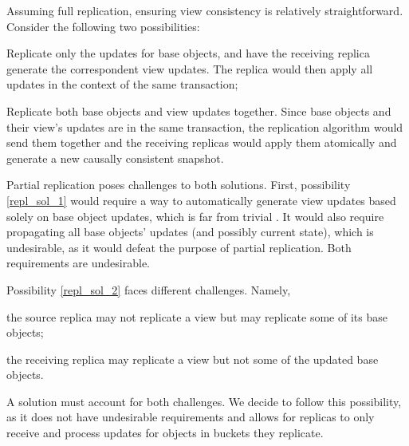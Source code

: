 \documentclass{vldb}
\begin{document}
Assuming full replication, ensuring view consistency is relatively straightforward.
Consider the following two possibilities:

\begin{compactenum}
	\item \label{repl_sol_1} Replicate only the updates for base objects, and have the receiving replica generate the correspondent view updates. The replica would then apply all updates in the context of the same transaction;
	\item \label{repl_sol_2} Replicate both base objects and view updates together. 
	Since base objects and their view's updates are in the same transaction, the replication algorithm would send them together and the receiving replicas would apply them atomically and generate a new causally consistent snapshot.	
\end{compactenum}

Partial replication poses challenges to both solutions.
First, possibility \ref{repl_sol_1} would require a way to automatically generate view updates based solely on base object updates, which is far from trivial \cite{ahmed2020automated}. %
It would also require propagating all base objects' updates (and possibly current state), which is undesirable, as it would defeat the purpose of partial replication.
Both requirements are undesirable.

Possibility \ref{repl_sol_2} faces different challenges.
Namely, 
\begin{enumerate*}[label=(\roman*)] 
	\item \label{item:view_challenge1}the source replica may not replicate a view but may replicate some of its base objects;
	\item \label{item:view_challenge2}the receiving replica may replicate a view but not some of the updated base objects.
\end{enumerate*}
A solution must account for both challenges.
We decide to follow this possibility, as it does not have undesirable requirements and allows for replicas to only receive and process updates for objects in buckets they replicate.
\end{document}
